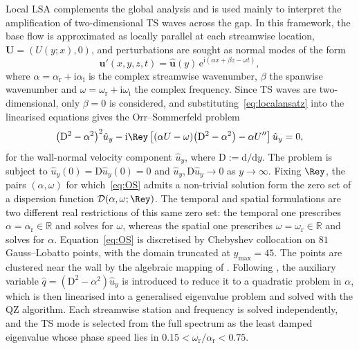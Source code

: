 \documentclass[lineno]{jfm}
\begin{document}
Local \ac{LSA} complements the global analysis and is used mainly to interpret the amplification of two-dimensional \ac{TS} waves across the gap. In this framework, the base flow is approximated as locally parallel at each streamwise location, $\boldsymbol{U}=(U(y;x),0)$, and perturbations are sought as normal modes of the form
\begin{equation}\label{eq:localansatz}
	\boldsymbol{u}'(x,y,z,t)
	=
	\hat{\boldsymbol{u}}(y)\,\mathrm{e}^{\mathrm{i}(\alpha x + \beta z - \omega t)},
\end{equation}
where $\alpha =\alpha_\mathrm{r}  + \mathrm{i}\alpha_\mathrm{i} $ is the complex streamwise wavenumber, $\beta $ the spanwise wavenumber and $\omega =\omega_\mathrm{r} +\mathrm{i}\omega_\mathrm{i} $ the complex frequency. Since \ac{TS} waves are two-dimensional, only $\beta=0$ is considered, and substituting~\eqref{eq:localansatz} into the linearised equations gives the Orr--Sommerfeld problem \citep{schmid2001stability}%
\begin{equation}\label{eq:OS}
	{\big({\mathrm{D}}^2-{\alpha}^2\big)}^2\hat{u}_y
	-\mathrm{i}\Rey\left[
		(\alpha U-\omega)\big({\mathrm{D}}^2-{\alpha}^2\big)
		-\alpha U''\right]\hat{u}_y=0,
\end{equation}
for the wall-normal velocity component $\hat{u}_y$, where $\mathrm{D}:=\mathrm{d}/\mathrm{d}y$. The problem is subject to $\hat{u}_y(0)=\mathrm{D}\hat{u}_y(0)=0$ and $\hat{u}_y,\mathrm{D}\hat{u}_y\to0$ as $y\to\infty$. Fixing $\Rey$, the pairs $(\alpha,\omega)$ for which~\eqref{eq:OS} admits a non-trivial solution form the zero set of a dispersion function $\mathcal{D}(\alpha,\omega;\Rey)$. The temporal and spatial formulations are two different real restrictions of this same zero set: the temporal one prescribes $\alpha=\alpha_\mathrm{r}\in\mathbb{R}$ and solves for $\omega$, whereas the spatial one prescribes $\omega=\omega_\mathrm{r}\in\mathbb{R}$ and solves for $\alpha$. Equation~\eqref{eq:OS} is discretised by Chebyshev collocation on $81$ Gauss--Lobatto points, with the domain truncated at $y_{\max}=45$. The points are clustered near the wall by the algebraic mapping of \citet{malik1990}. Following \citet{bridgesMorris1984}, the auxiliary variable $\hat{q}=({\mathrm{D}}^2-\alpha^2)\hat{u}_y$ is introduced to reduce it to a quadratic problem in $\alpha$, which is then linearised into a generalised eigenvalue problem and solved with the QZ algorithm. Each streamwise station and frequency is solved independently, and the \ac{TS} mode is selected from the full spectrum as the least damped eigenvalue whose phase speed lies in $0.15<\omega_\mathrm{r}/\alpha_\mathrm{r}<0.75$.
\end{document}
